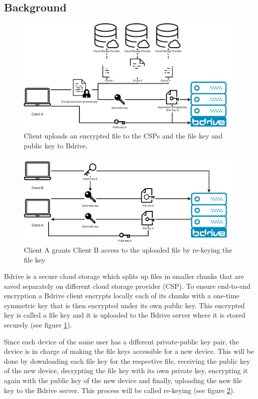 \subsection{Background}
\begin{figure}[!ht]
\centering
    \includegraphics[width=0.8\linewidth]{img/bdrive1.png}\par 
    \caption{Client uploads an encrypted file to the CSPs and the file key and public key to Bdrive.}
    \label{fig:filekey}
\end{figure}
\begin{figure}[!ht]
\centering
    \includegraphics[width=0.8\linewidth]{img/bdrive2.png}\par
    \caption{Client A grants Client B access to the uploaded file by re-keying the file key}
    \label{fig:rekey}
\end{figure}

Bdrive is a secure cloud storage which splits up files in smaller chunks that are saved separately on different cloud storage provider (CSP). To ensure end-to-end encryption a Bdrive client encrypts locally each of its chunks with a one-time symmetric key that is then encrypted under its own public key. This encrypted key is called a file key and it is uploaded to the Bdrive server where it is stored securely (see figure \ref{fig:filekey}).

Since each device of the same user has a different private-public key pair, the device is in charge of making the file keys accessible for a new device. This will be done by downloading each file key for the respective file, receiving the public key of the new device, decrypting the file key with its own private key, encrypting it again with the public key of the new device and finally, uploading the new file key to the Bdrive server. This process will be called re-keying (see figure \ref{fig:rekey}).


